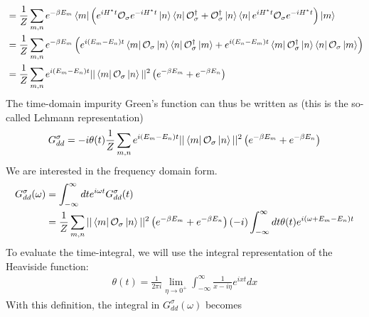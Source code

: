 \documentclass{report}
\numberwithin{equation}{section}
\begin{document}
\begin{appendices}
\begin{equation}
\begin{aligned}
	&= \frac{1}{Z}\sum_{m,n}e^{-\beta E_m}\bra{m}\left( e^{iH^* t}\mathcal{O}_{\sigma}e^{-iH^* t}\ket{n}\bra{n}\mathcal{O}^\dagger_{\sigma} + \mathcal{O}^\dagger_{\sigma}\ket{n}\bra{n}e^{iH^* t}\mathcal{O}_{\sigma}e^{-iH^* t}\right) \ket{m}\\
	&= \frac{1}{Z}\sum_{m,n}e^{-\beta E_m}\left( e^{i\left( E_m - E_n \right)  t}\bra{m}\mathcal{O}_{\sigma}\ket{n}\bra{n}\mathcal{O}^\dagger_{\sigma} \ket{m} + e^{i\left( E_n - E_m \right)  t}\bra{m}\mathcal{O}^\dagger_{\sigma}\ket{n}\bra{n}\mathcal{O}_{\sigma} \ket{m}\right)\\
	&= \frac{1}{Z}\sum_{m,n}e^{i\left( E_m - E_n \right)  t}||\bra{m}\mathcal{O}_{\sigma}\ket{n}||^2\left( e^{-\beta E_m} + e^{-\beta E_n}\right)\\
\end{aligned}\end{equation}
The time-domain impurity Green's function can thus be written as (this is the so-called Lehmann representation)
\begin{equation}\begin{aligned}
	G_{dd}^\sigma = -i\theta(t)\frac{1}{Z}\sum_{m,n}e^{i\left( E_m - E_n \right)  t}||\bra{m}\mathcal{O}_{\sigma}\ket{n}||^2\left( e^{-\beta E_m} + e^{-\beta E_n}\right)\\
\end{aligned}\end{equation}
We are interested in the frequency domain form.
\begin{equation}\begin{aligned}
	G_{d d}^\sigma(\omega) &= \int_{-\infty}^\infty dt e^{i \omega t}G_{d d}^\sigma(t) \\
			       &= \frac{1}{Z}\sum_{m,n}||\bra{m}\mathcal{O}_{\sigma}\ket{n}||^2\left( e^{-\beta E_m} + e^{-\beta E_n}\right)\left(-i\right)\int_{-\infty}^\infty dt \theta(t)e^{i\left( \omega + E_m - E_n \right)t}
\end{aligned}\end{equation}
To evaluate the time-integral, we will use the integral representation of the Heaviside function:
\begin{equation}\begin{aligned}
	\theta(t) = \frac{1}{2\pi i}\lim_{\eta \to 0^+} \int_{-\infty}^\infty \frac{1}{x- i\eta}e^{ixt}dx
\end{aligned}\end{equation}
With this definition, the integral in \(G_{dd}^\sigma(\omega)\) becomes
\begin{equation}\begin{aligned}

\end{aligned}
\end{equation}
\end{appendices}
\end{document}
